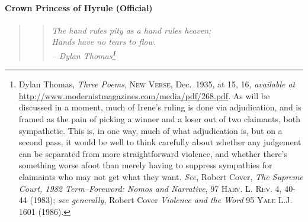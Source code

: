   \paragraph{Crown Princess of Hyrule (Official)}\label{sec:machiavelli}
      \begin{quote}
      \begin{verse}\begingroup\it 
      The hand rules pity as a hand rules heaven;\\
      Hands have no tears to flow.\endgroup\\
      \hfill -- Dylan Thomas\footnote{Dylan Thomas, \textit{Three Poems}, \textsc{New Verse}, Dec.~1935, at 15, 16, \textit{available at} \url{http://www.modernistmagazines.com/media/pdf/268.pdf}. As will be discussed in a moment, much of Irene's ruling is done via adjudication, and is framed as the pain of picking a winner and a loser out of two claimants, both sympathetic. This is, in one way, much of what adjudication is, but on a second pass, it would be well to think carefully about whether any judgement can be separated from more straightforward violence, and whether there's something worse afoot than merely having to suppress sympathies for claimaints who may not get what they want. \textit{See},  Robert Cover, \textit{The Supreme Court, 1982 Term--Foreword: Nomos and Narrative}, 97 \textsc{Harv. L. Rev.} 4, 40-44 (1983); \textit{see generally}, Robert Cover \textit{Violence and the Word} \textsc{95 Yale L.J. 1601} (1986).}
      \end{verse}
      \end{quote}
